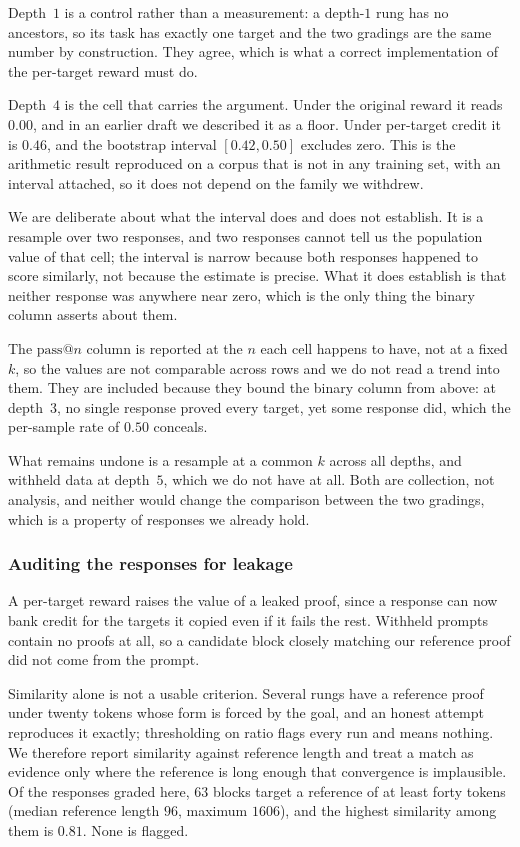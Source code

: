 \documentclass[11pt]{article}
\begin{document}
Depth~$1$ is a control rather than a measurement: a depth-$1$ rung has no
ancestors, so its task has exactly one target and the two gradings are the same
number by construction. They agree, which is what a correct implementation of the
per-target reward must do.

Depth~$4$ is the cell that carries the argument. Under the original reward it
reads $0.00$, and in an earlier draft we described it as a floor. Under
per-target credit it is $0.46$, and the bootstrap interval $[0.42, 0.50]$
excludes zero. This is the arithmetic result reproduced on a corpus that is not
in any training set, with an interval attached, so it does not depend on the
family we withdrew.

We are deliberate about what the interval does and does not establish. It is a
resample over two responses, and two responses cannot tell us the population
value of that cell; the interval is narrow because both responses happened to
score similarly, not because the estimate is precise. What it does establish is
that neither response was anywhere near zero, which is the only thing the binary
column asserts about them.

The $\mathrm{pass}@n$ column is reported at the $n$ each cell happens to have,
not at a fixed $k$, so the values are not comparable across rows and we do not
read a trend into them. They are included because they bound the binary column
from above: at depth~$3$, no single response proved every target, yet some
response did, which the per-sample rate of $0.50$ conceals.

What remains undone is a resample at a common $k$ across all depths, and withheld
data at depth~$5$, which we do not have at all. Both are collection, not
analysis, and neither would change the comparison between the two gradings, which
is a property of responses we already hold.

\subsubsection*{Auditing the responses for leakage}

A per-target reward raises the value of a leaked proof, since a response can now
bank credit for the targets it copied even if it fails the rest. Withheld prompts
contain no proofs at all, so a candidate block closely matching our reference
proof did not come from the prompt.

Similarity alone is not a usable criterion. Several rungs have a reference proof
under twenty tokens whose form is forced by the goal, and an honest attempt
reproduces it exactly; thresholding on ratio flags every run and means nothing.
We therefore report similarity against reference length and treat a match as
evidence only where the reference is long enough that convergence is implausible.
Of the responses graded here, $63$ blocks target a reference of at least forty
tokens (median reference length $96$, maximum $1606$), and the highest similarity
among them is $0.81$. None is flagged.
\end{document}
